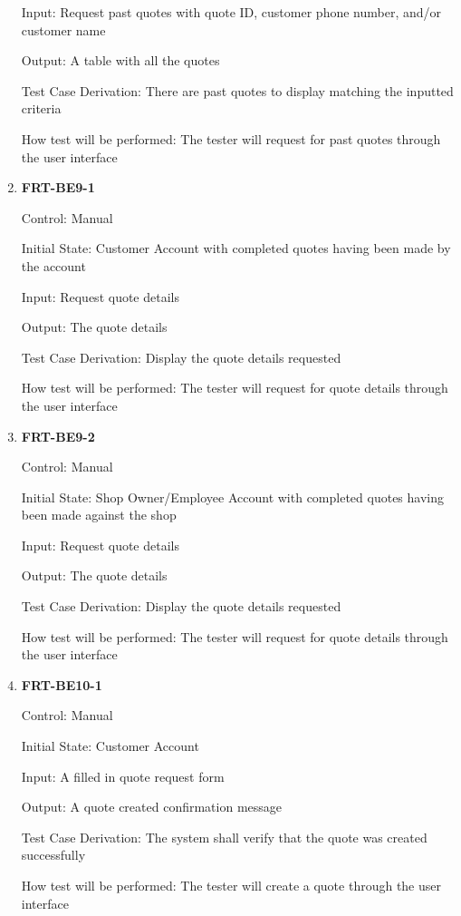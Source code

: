 \documentclass[12pt, titlepage]{article}
\begin{document}
\begin{enumerate}
	      Input: Request past quotes with quote ID, customer phone number, and/or customer name

	      Output: A table with all the quotes

	      Test Case Derivation: There are past quotes to display matching the inputted criteria

	      How test will be performed: The tester will request for past quotes through the user interface

	\item \textbf{FRT-BE9-1}

	      Control: Manual

	      Initial State: Customer Account with completed quotes having been made by the account

	      Input: Request quote details

	      Output: The quote details

	      Test Case Derivation: Display the quote details requested

	      How test will be performed: The tester will request for quote details through the user interface

	\item \textbf{FRT-BE9-2}

	      Control: Manual

	      Initial State: Shop Owner/Employee Account with completed quotes having been made against the shop

	      Input: Request quote details

	      Output: The quote details

	      Test Case Derivation: Display the quote details requested

	      How test will be performed: The tester will request for quote details through the user interface

	\item \textbf{FRT-BE10-1}

	      Control: Manual

	      Initial State: Customer Account

	      Input: A filled in quote request form

	      Output: A quote created confirmation message

	      Test Case Derivation: The system shall verify that the quote was created successfully

	      How test will be performed: The tester will create a quote through the user interface


\end{enumerate}
\end{document}

